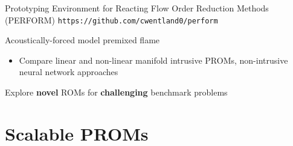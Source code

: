 \documentclass[]{beamer}
\begin{document}
\begin{frame}{\footnotesize{Prototyping Environment for Reacting Flow Order Reduction Methods (PERFORM)}}
	\vspace{1em}
	\centering
	\texttt{https://github.com/cwentland0/perform}
\end{frame}

\begin{frame}{Acoustically-forced model premixed flame}
	\begin{itemize}
		\item Compare linear and non-linear manifold intrusive PROMs, non-intrusive neural network approaches
	\end{itemize}

	\centering
	\begin{figure}
	\end{figure}
	
	\begin{tcolorbox}[colframe=blue!50!white,halign=center]
		Explore \textbf{novel} ROMs for \textbf{challenging} benchmark problems
	\end{tcolorbox}
\end{frame}

\section*{Scalable PROMs}
\end{document}
